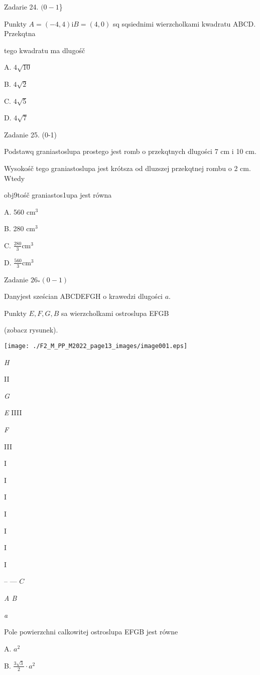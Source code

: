 \documentclass[a4paper,12pt]{article}
\begin{document}
Zadarie 24. $(0-1$\}

Punkty $A=(-4,4) \mathrm{i} B=(4,0)$ sq sqsiednimi wierzcholkami kwadratu ABCD. Przekqtna

tego kwadratu ma dlugośč

A. $4\sqrt{10}$

B. $4\sqrt{2}$

C. $4\sqrt{5}$

D. $4\sqrt{7}$

Zadanie 25. (0-1)

Podstawq graniastoslupa prostego jest romb o przekqtnych dlugości 7 cm i 10 cm.

Wysokośč tego graniastoslupa jest krótsza od dluzszej przekqtnej rombu o 2 cm. Wtedy

obj9tośč graniastos1upa jest równa

A. 560 $\mathrm{c}\mathrm{m}^{3}$

B. 280 $\mathrm{c}\mathrm{m}^{3}$

C. $\displaystyle \frac{280}{3}\mathrm{c}\mathrm{m}^{3}$

D. $\displaystyle \frac{560}{3}\mathrm{c}\mathrm{m}^{3}$

Zadanie $26_{*}(0-1)$

Danyjest sześcian ABCDEFGH o krawedzi dlugości $a.$

Punkty $E, F, G, B$ sa wierzcholkami ostroslupa EFGB

(zobacz rysunek).
\begin{center}
\texttt{[image: ./F2\_M\_PP\_M2022\_page13\_images/image001.eps]}
\end{center}
{\it H}

II

{\it G}

{\it E}  IIII

{\it F}

III

I

I

I

I

I

I

I

-- --- $C$

{\it A  B}

{\it a}

Pole powierzchni calkowitej ostroslupa EFGB jest równe

A. $a^{2}$

B. $\displaystyle \frac{3\sqrt{3}}{2}\cdot a^{2}$
\end{document}
